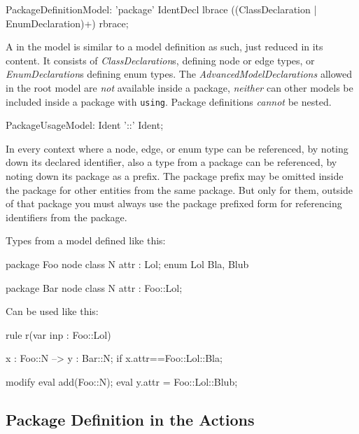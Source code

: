 \begin{rail}
  PackageDefinitionModel: 'package' IdentDecl lbrace
	                   ((ClassDeclaration
  									 | EnumDeclaration)+)
										rbrace;
\end{rail}

A  in the model is similar to a model definition as such, just reduced in its content.
It consists of \emph{ClassDeclaration}s, defining node or edge types, or \emph{EnumDeclaration}s defining enum types.
The \emph{AdvancedModelDeclarations} allowed in the root model are \emph{not} available inside a package, \emph{neither} can other models be included inside a package with \texttt{using}.
Package definitions \emph{cannot} be nested.

\begin{rail}
  PackageUsageModel: Ident '::' Ident;
\end{rail}

In every context where a node, edge, or enum type can be referenced,
by noting down its declared identifier, 
also a type from a package can be referenced,
by noting down its package as a prefix.
The package prefix may be omitted inside the package for other entities from the same package.
But only for them, outside of that package you must always use the package prefixed form for referencing identifiers from the package.

\begin{example}
Types from a model defined like this:
	\begin{grgen}
package Foo {
	node class N {
		attr : Lol;
	}
	enum Lol {
		Bla,
		Blub
	}
}

package Bar {
	node class N {
		attr : Foo::Lol;
	}	
}
	\end{grgen}
Can be used like this:
	\begin{grgen}
rule r(var inp : Foo::Lol) {
	x : Foo::N --> y : Bar::N;
	if{ x.attr==Foo::Lol::Bla; }

	modify {
		eval{ add(Foo::N); }
		eval{ y.attr = Foo::Lol::Blub; }
	}
}	
	\end{grgen}
\end{example}
	
\subsection{Package Definition in the Actions}\label{sub:packageaction} 

